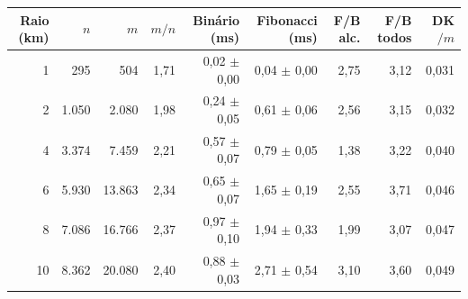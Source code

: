 \begin{tabular}{rrrrrrrrr}
\toprule
Raio (km) & $n$ & $m$ & $m/n$ & Binário (ms) & Fibonacci (ms) & F/B alc. & F/B todos & DK$/m$ \\
\midrule
1 & 295 & 504 & 1,71 & 0,02 $\pm$ 0,00 & 0,04 $\pm$ 0,00 & 2,75 & 3,12 & 0,031 \\
2 & 1.050 & 2.080 & 1,98 & 0,24 $\pm$ 0,05 & 0,61 $\pm$ 0,06 & 2,56 & 3,15 & 0,032 \\
4 & 3.374 & 7.459 & 2,21 & 0,57 $\pm$ 0,07 & 0,79 $\pm$ 0,05 & 1,38 & 3,22 & 0,040 \\
6 & 5.930 & 13.863 & 2,34 & 0,65 $\pm$ 0,07 & 1,65 $\pm$ 0,19 & 2,55 & 3,71 & 0,046 \\
8 & 7.086 & 16.766 & 2,37 & 0,97 $\pm$ 0,10 & 1,94 $\pm$ 0,33 & 1,99 & 3,07 & 0,047 \\
10 & 8.362 & 20.080 & 2,40 & 0,88 $\pm$ 0,03 & 2,71 $\pm$ 0,54 & 3,10 & 3,60 & 0,049 \\
\bottomrule
\end{tabular}

